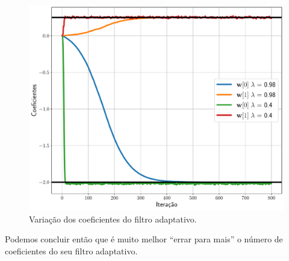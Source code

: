 \documentclass{homeworkclass}
\begin{document}
\begin{homeworkProblem}
	\begin{figure}[!ht]
	\centering
	\includegraphics[width=0.5\linewidth]{figs/coeficientes}
	\caption{Variação dos coeficientes do filtro adaptativo.}
	\label{fig:coef}
	\end{figure}
	
	Podemos concluir então que é muito melhor ``errar para mais'' o número de coeficientes do seu filtro adaptativo.

\end{homeworkProblem}
\end{document}
